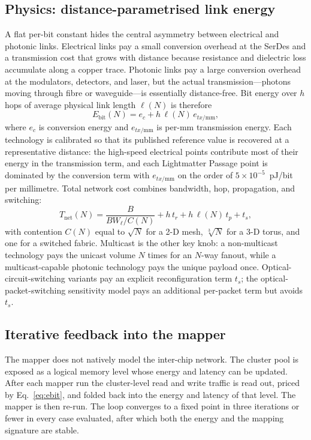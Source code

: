 \documentclass[conference]{IEEEtran}
\newcommand{\pjbit}{pJ/bit}
\begin{document}
\subsection{Physics: distance-parametrised link energy}
\label{sec:physics}
A flat per-bit constant hides the central asymmetry between
electrical and photonic links. Electrical links pay a small
conversion overhead at the SerDes and a transmission cost that
grows with distance because resistance and dielectric loss
accumulate along a copper trace. Photonic links pay a large
conversion overhead at the modulators, detectors, and laser, but
the actual transmission---photons moving through fibre or
waveguide---is essentially distance-free. Bit energy over $h$
hops of average physical link length $\ell(N)$ is therefore
\begin{equation}
E_{\text{bit}}(N) = e_c + h\,\ell(N)\,e_{tx/\text{mm}},
\label{eq:ebit}
\end{equation}
where $e_c$ is conversion energy and $e_{tx/\text{mm}}$ is per-mm
transmission energy. Each technology is calibrated so that its
published reference value is recovered at a representative
distance: the high-speed electrical points contribute most of
their energy in the transmission term, and each Lightmatter
Passage point is dominated by the conversion term with
$e_{tx/\text{mm}}$ on the order of $5{\times}10^{-5}$~\pjbit{}
per millimetre. Total network cost combines bandwidth, hop,
propagation, and switching:
\begin{equation}
T_{\text{net}}(N) = \frac{B}{BW_\ell/C(N)} + h\,t_r
                  + h\,\ell(N)\,t_p + t_s ,
\end{equation}
with contention $C(N)$ equal to $\sqrt{N}$ for a 2-D mesh,
$\sqrt[3]{N}$ for a 3-D torus, and one for a switched fabric.
Multicast is the other key knob: a non-multicast technology pays
the unicast volume $N$ times for an $N$-way fanout, while a
multicast-capable photonic technology pays the unique payload
once. Optical-circuit-switching variants pay an explicit
reconfiguration term $t_s$; the optical-packet-switching
sensitivity model pays an additional per-packet term but avoids
$t_s$.

\subsection{Iterative feedback into the mapper}
The mapper does not natively model the inter-chip network. The
cluster pool is exposed as a logical memory level whose energy
and latency can be updated. After each mapper run the
cluster-level read and write traffic is read out, priced by
Eq.~\ref{eq:ebit}, and folded back into the energy and latency of
that level. The mapper is then re-run. The loop converges to a
fixed point in three iterations or fewer in every case
evaluated, after which both the energy and the mapping signature
are stable.
\end{document}
